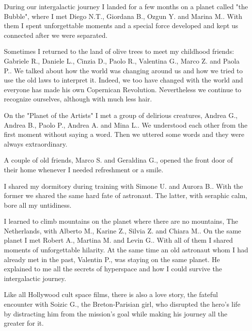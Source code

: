 During our intergalactic journey I landed for a few months on a planet called "the Bubble", where I met Diego N.T., Giordana B., Ozgun Y. and Marina M.. With them I spent unforgettable moments and a special force developed and kept us connected after we were separated.

Sometimes I returned to the land of olive trees to meet my childhood friends: Gabriele R., Daniele L., Cinzia D., Paolo R., Valentina G., Marco Z. and Paola P.. We talked about how the world was changing around us and how we tried to use the old laws to interpret it. Indeed, we too have changed with the world and everyone has made his own Copernican Revolution. Nevertheless we continue to recognize ourselves, although with much less hair.

On the "Planet of the Artists" I met a group of delirious creatures, Andrea G., Andrea B., Paolo P., Andrea A. and Mina L.. We understood each other from the first moment without saying a word. Then we uttered some words and they were always extraordinary.

A couple of old friends, Marco S. and Geraldina G., opened the front door of their home whenever I needed refreshment or a smile.

I shared my dormitory during training with Simone U. and Aurora B.. With the former we shared the same hard fate of astronaut. The latter, with seraphic calm, bore all my untidiness.

I learned to climb mountains on the planet where there are no mountains, The Netherlands, with Alberto M., Karine Z., Silvia Z. and Chiara M.. On the same planet I met Robert A., Martina M. and Levin G.. With all of them I shared moments of unforgettable hilarity. At the same time an old astronaut whom I had already met in the past, Valentin P., was staying on the same planet. He explained to me all the secrets of hyperspace and how I could survive the intergalactic journey.

Like all Hollywood cult space films, there is also a love story, the fateful encounter with Soizic G., the Breton-Parisian girl, who disrupted the hero's life by distracting him from the mission's goal while making his journey all the greater for it.
